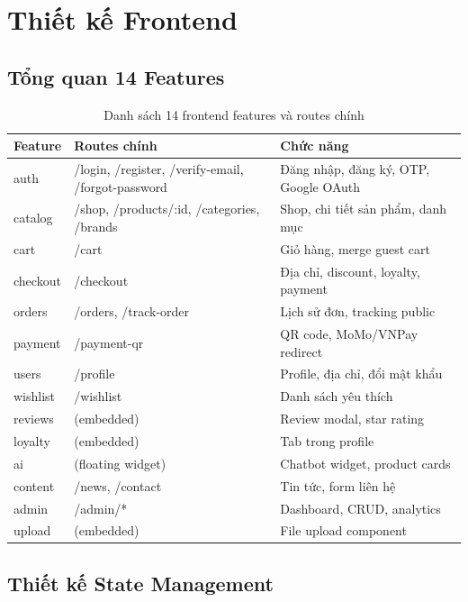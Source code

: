 \section{Thiết kế Frontend}

\subsection{Tổng quan 14 Features}

\begin{table}[H]
\centering
\caption{Danh sách 14 frontend features và routes chính}
\begin{tabular}{|l|p{4cm}|p{5.5cm}|}
\hline
\textbf{Feature} & \textbf{Routes chính} & \textbf{Chức năng} \\
\hline
auth & /login, /register, /verify-email, /forgot-password & Đăng nhập, đăng ký, OTP, Google OAuth \\
\hline
catalog & /shop, /products/:id, /categories, /brands & Shop, chi tiết sản phẩm, danh mục \\
\hline
cart & /cart & Giỏ hàng, merge guest cart \\
\hline
checkout & /checkout & Địa chỉ, discount, loyalty, payment \\
\hline
orders & /orders, /track-order & Lịch sử đơn, tracking public \\
\hline
payment & /payment-qr & QR code, MoMo/VNPay redirect \\
\hline
users & /profile & Profile, địa chỉ, đổi mật khẩu \\
\hline
wishlist & /wishlist & Danh sách yêu thích \\
\hline
reviews & (embedded) & Review modal, star rating \\
\hline
loyalty & (embedded) & Tab trong profile \\
\hline
ai & (floating widget) & Chatbot widget, product cards \\
\hline
content & /news, /contact & Tin tức, form liên hệ \\
\hline
admin & /admin/* & Dashboard, CRUD, analytics \\
\hline
upload & (embedded) & File upload component \\
\hline
\end{tabular}
\end{table}

\subsection{Thiết kế State Management}


